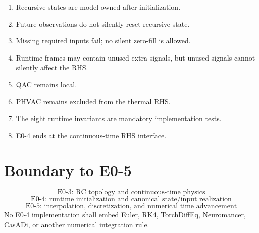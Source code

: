 \documentclass[11pt]{article}
\begin{document}
\begin{enumerate}[leftmargin=*]
\item Recursive states are model-owned after initialization.
\item Future observations do not silently reset recursive state.
\item Missing required inputs fail; no silent zero-fill is allowed.
\item Runtime frames may contain unused extra signals, but unused signals cannot silently affect the RHS.
\item QAC remains local.
\item PHVAC remains excluded from the thermal RHS.
\item The eight runtime invariants are mandatory implementation tests.
\item E0-4 ends at the continuous-time RHS interface.
\end{enumerate}

\section{Boundary to E0-5}
\[
\boxed{\text{E0-3: RC topology and continuous-time physics}}
\]
\[
\boxed{\text{E0-4: runtime initialization and canonical state/input realization}}
\]
\[
\boxed{\text{E0-5: interpolation, discretization, and numerical time advancement}}
\]
No E0-4 implementation shall embed Euler, RK4, TorchDiffEq, Neuromancer, CasADi, or
another numerical integration rule.



\end{document}
